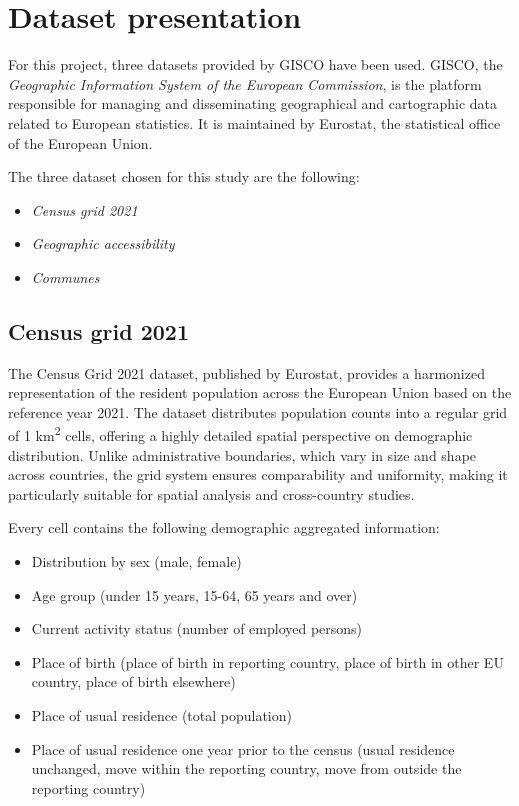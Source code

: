 \section{Dataset presentation}

For this project, three datasets provided by GISCO have been used.
GISCO, the \emph{Geographic Information System of the European Commission}, is the platform responsible for managing and disseminating geographical and cartographic data related to European statistics.
It is maintained by Eurostat, the statistical office of the European Union.

The three dataset chosen for this study are the following:
\begin{itemize}
	\item \emph{Census grid 2021}
	\item \emph{Geographic accessibility}
	\item \emph{Communes}
\end{itemize}


\subsection{Census grid 2021}

The Census Grid 2021 dataset, published by Eurostat, provides a harmonized representation of the resident population across the European Union based on the reference year 2021.
The dataset distributes population counts into a regular grid of 1 km\textsuperscript{2} cells, offering a highly detailed spatial perspective on demographic distribution.
Unlike administrative boundaries, which vary in size and shape across countries, the grid system ensures comparability and uniformity, making it particularly suitable for spatial analysis and cross-country studies.

Every cell contains the following demographic aggregated information:
\begin{itemize}
	\item Distribution by sex (male, female)
	\item Age group (under 15 years, 15-64, 65 years and over)
	\item Current activity status (number of employed persons)
	\item Place of birth (place of birth in reporting country, place of birth in other EU country, place of birth elsewhere)
	\item Place of usual residence (total population)
	\item Place of usual residence one year prior to the census (usual residence unchanged, move within the reporting country, move from outside the reporting country)
\end{itemize}

